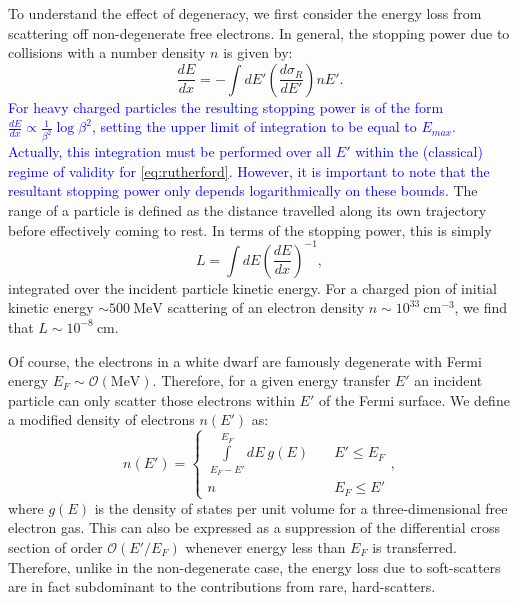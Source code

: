 \documentclass[11 pt, preprint,preprintnumbers,amsmath,amssymb, prd]{revtex4}
\newcommand{\OO}{\mathcal{O}}
\begin{document}
To understand the effect of degeneracy, we first consider the energy loss from scattering off non-degenerate free electrons. In general, the stopping power due to collisions with a number density $n$ is given by:
\begin{equation}
\label{eq:SP}
\frac{dE}{dx} = - \int dE' \left(\frac{d \sigma_R}{dE'}\right) n E'.
\end{equation}
\textcolor{blue}{For heavy charged particles the resulting stopping power is of the form $\frac{dE}{dx} \propto \frac{1}{\beta^2} \log{\beta^2}$, setting the upper limit of integration to be equal to $E_{max}$. Actually, this integration must be performed over all $E'$ within the (classical) regime of validity for \eqref{eq:rutherford}. However, it is important to note that the resultant stopping power only depends logarithmically on these bounds.} The range of a particle is defined as the distance travelled along its own trajectory before effectively coming to rest. In terms of the stopping power, this is simply
\begin{equation}
L = \int dE \left(\frac{dE}{dx}\right)^{-1},
\end{equation}
integrated over the incident particle kinetic energy. For a charged pion of initial kinetic energy $\sim 500 ~\text{MeV}$ scattering of an electron density $n \sim 10^{33} ~\text{cm}^{-3}$, we find that $L \sim 10^{-8} ~\text{cm}$. 

Of course, the electrons in a white dwarf are famously degenerate with Fermi energy $E_F \sim \OO(\text{MeV})$. Therefore, for a given energy transfer $E'$ an incident particle can only scatter those electrons within $E'$ of the Fermi surface. We define a modified density of electrons $n(E')$ as:
\begin{equation}
n(E') = \left\{
        \begin{array}{ll}
            \displaystyle \int \limits_{E_F -E'}^{E_F}dE ~g(E) & \quad E' \leq E_F \\
            n & \quad E_F \leq E'
        \end{array}
    \right.,
\end{equation}
where $g(E)$ is the density of states per unit volume for a three-dimensional free electron gas. This can also be expressed as a suppression of the differential cross section of order $\mathcal{O}(E'/E_F)$ whenever energy less than $E_F$ is transferred. Therefore, unlike in the non-degenerate case, the energy loss due to soft-scatters are in fact subdominant to the contributions from rare, hard-scatters. 
\end{document}
